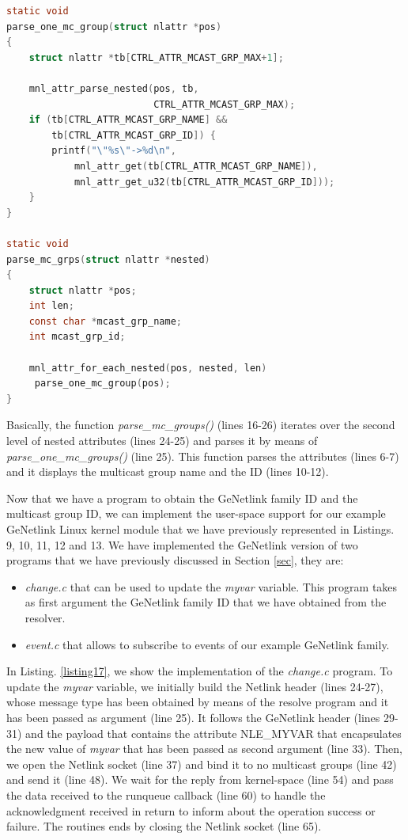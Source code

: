 \documentclass[10pt,onecolumn]{article}
\begin{document}
\begin{lstlisting}[language=C, caption=Parsing GeNetlink multicast groups, label=listing16]
static void
parse_one_mc_group(struct nlattr *pos)
{
    struct nlattr *tb[CTRL_ATTR_MCAST_GRP_MAX+1];

    mnl_attr_parse_nested(pos, tb,
                          CTRL_ATTR_MCAST_GRP_MAX);
    if (tb[CTRL_ATTR_MCAST_GRP_NAME] &&
        tb[CTRL_ATTR_MCAST_GRP_ID]) {
        printf("\"%s\"->%d\n",
            mnl_attr_get(tb[CTRL_ATTR_MCAST_GRP_NAME]),
            mnl_attr_get_u32(tb[CTRL_ATTR_MCAST_GRP_ID]));
    }
}

static void
parse_mc_grps(struct nlattr *nested)
{
    struct nlattr *pos;
    int len;
    const char *mcast_grp_name;
    int mcast_grp_id;

    mnl_attr_for_each_nested(pos, nested, len)
     parse_one_mc_group(pos);
}
\end{lstlisting}

Basically, the function \textit{parse\_mc\_groups()} (lines 16-26) iterates over the second level of nested attributes (lines 24-25) and parses it by means of \textit{parse\_one\_mc\_groups()} (line 25). This function parses the attributes (lines 6-7) and it displays the multicast group name and the ID (lines 10-12).

Now that we have a program to obtain the GeNetlink family ID and the multicast group ID, we can implement the user-space support for our example GeNetlink Linux kernel module that we have previously represented in Listings. 9, 10, 11, 12 and 13. We have implemented the GeNetlink version of two programs that we have previously discussed in Section \ref{sec}, they are:

\begin{itemize}
  \item \textit{change.c} that can be used to update the \textit{myvar} variable. This program takes as first argument the GeNetlink family ID that we have obtained from the resolver.
  \item \textit{event.c} that allows to subscribe to events of our example GeNetlink family.
\end{itemize}

In Listing. \ref{listing17}, we show the implementation of the \textit{change.c} program. To update the \textit{myvar} variable, we initially build the Netlink header (lines 24-27), whose message type has been obtained by means of the resolve program and it has been passed as argument (line 25). It follows the GeNetlink header (lines 29-31) and the payload that contains the attribute NLE\_MYVAR that encapsulates the new value of \textit{myvar} that has been passed as second argument (line 33). Then, we open the Netlink socket (line 37) and bind it to no multicast groups (line 42) and send it (line 48). We wait for the reply from kernel-space (line 54) and pass the data received to the runqueue callback (line 60) to handle the acknowledgment received in return to inform about the operation success or failure. The routines ends by closing the Netlink socket (line 65).
\end{document}

